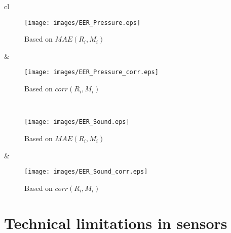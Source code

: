 \documentclass{article}
\begin{document}
\addtocounter{figure}{-1}
\begin{figure*}[h]
    \centering
\begin{xtabular*}{\textwidth}{cl}
 \\
    \begin{subfigure}[b]{0.45\textwidth}
        \texttt{[image: images/EER\_Pressure.eps]}
        \caption{Based on $MAE(R_i,M_i)$}
        \label{fig:EER_Pressure}
        \end{subfigure}
 &
     \begin{subfigure}[b]{0.45\textwidth}
        \texttt{[image: images/EER\_Pressure\_corr.eps]}
        \caption{Based on $corr(R_i,M_i)$}
        \label{fig:EER-Corr_Pressure_corr}
    \end{subfigure}
 \\
    \begin{subfigure}[b]{0.45\textwidth}
        \texttt{[image: images/EER\_Sound.eps]}
        \caption{Based on $MAE(R_i,M_i)$}
        \label{fig:EER_Sound}
    \end{subfigure}
    &
    \begin{subfigure}[b]{0.45\textwidth}
        \texttt{[image: images/EER\_Sound\_corr.eps]}
        \caption{Based on $corr(R_i,M_i)$}
        \label{fig:EER_Sound_corr}
    \end{subfigure}
    \end{xtabular*}
\end{figure*}

\section{Technical limitations in sensors}
\label{sec:appendixB}
\end{document}

